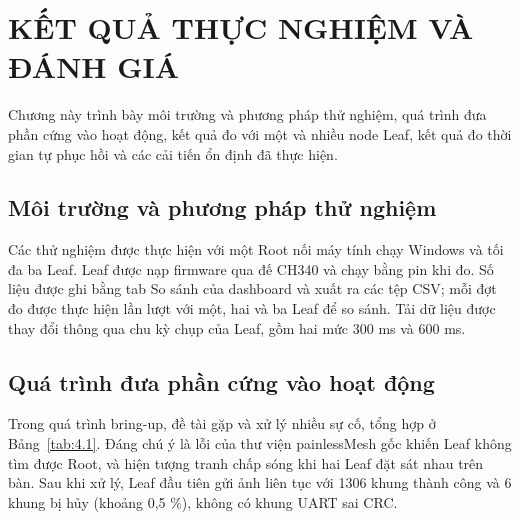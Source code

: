 \chapter{KẾT QUẢ THỰC NGHIỆM VÀ ĐÁNH GIÁ}\label{chap:4}

Chương này trình bày môi trường và phương pháp thử nghiệm, quá trình đưa phần cứng vào hoạt động, kết quả đo với một và nhiều node Leaf, kết quả đo thời gian tự phục hồi và các cải tiến ổn định đã thực hiện.


\section{Môi trường và phương pháp thử nghiệm}

Các thử nghiệm được thực hiện với một Root nối máy tính chạy Windows và tối đa ba Leaf. Leaf được nạp firmware qua đế CH340 và chạy bằng pin khi đo. Số liệu được ghi bằng tab So sánh của dashboard và xuất ra các tệp CSV; mỗi đợt đo được thực hiện lần lượt với một, hai và ba Leaf để so sánh. Tải dữ liệu được thay đổi thông qua chu kỳ chụp của Leaf, gồm hai mức 300 ms và 600 ms.


\section{Quá trình đưa phần cứng vào hoạt động}

Trong quá trình bring-up, đề tài gặp và xử lý nhiều sự cố, tổng hợp ở Bảng~\ref{tab:4.1}. Đáng chú ý là lỗi của thư viện painlessMesh gốc khiến Leaf không tìm được Root, và hiện tượng tranh chấp sóng khi hai Leaf đặt sát nhau trên bàn. Sau khi xử lý, Leaf đầu tiên gửi ảnh liên tục với 1306 khung thành công và 6 khung bị hủy (khoảng 0,5 \%), không có khung UART sai CRC.


